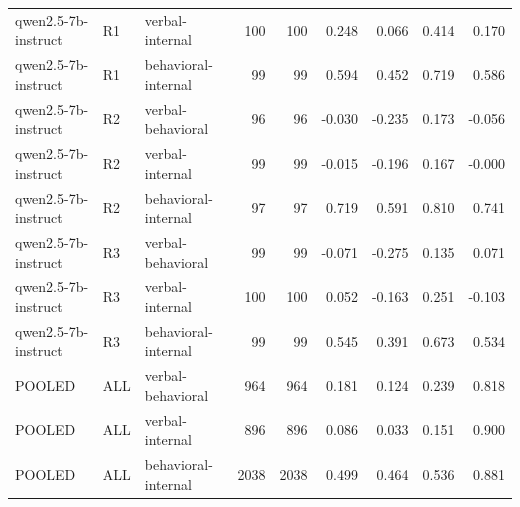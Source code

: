 \begin{table}
\begin{tabular}{lllrrrrrr}
qwen2.5-7b-instruct & R1 & verbal-internal & 100 & 100 & 0.248 & 0.066 & 0.414 & 0.170 \\
qwen2.5-7b-instruct & R1 & behavioral-internal & 99 & 99 & 0.594 & 0.452 & 0.719 & 0.586 \\
qwen2.5-7b-instruct & R2 & verbal-behavioral & 96 & 96 & -0.030 & -0.235 & 0.173 & -0.056 \\
qwen2.5-7b-instruct & R2 & verbal-internal & 99 & 99 & -0.015 & -0.196 & 0.167 & -0.000 \\
qwen2.5-7b-instruct & R2 & behavioral-internal & 97 & 97 & 0.719 & 0.591 & 0.810 & 0.741 \\
qwen2.5-7b-instruct & R3 & verbal-behavioral & 99 & 99 & -0.071 & -0.275 & 0.135 & 0.071 \\
qwen2.5-7b-instruct & R3 & verbal-internal & 100 & 100 & 0.052 & -0.163 & 0.251 & -0.103 \\
qwen2.5-7b-instruct & R3 & behavioral-internal & 99 & 99 & 0.545 & 0.391 & 0.673 & 0.534 \\
POOLED & ALL & verbal-behavioral & 964 & 964 & 0.181 & 0.124 & 0.239 & 0.818 \\
POOLED & ALL & verbal-internal & 896 & 896 & 0.086 & 0.033 & 0.151 & 0.900 \\
POOLED & ALL & behavioral-internal & 2038 & 2038 & 0.499 & 0.464 & 0.536 & 0.881 \\
\bottomrule
\end{tabular}
\end{table}
